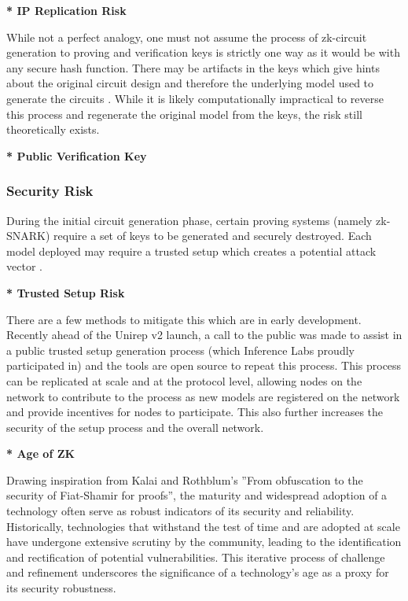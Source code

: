 \documentclass[conference]{IEEEtran}
\begin{document}
\textbf{* IP Replication Risk}

While not a perfect analogy, one must not assume the process of zk-circuit generation to proving and veriﬁcation keys is strictly one way as it would be with any secure hash function. There may be artifacts in the keys which give hints about the original circuit design and therefore the underlying model used to generate the circuits \cite{BenSasson2014SuccinctNZ}. While it is likely computationally impractical to reverse this process and regenerate the original model from the keys, the risk still theoretically exists.

\textbf{* Public Veriﬁcation Key}

\subsubsection{Security Risk}

During the initial circuit generation phase, certain proving systems (namely zk-SNARK) require a set of keys to be generated and securely destroyed. Each model deployed may require a trusted setup which creates a potential attack vector \cite{Bowe2017ScalableMC}.

\textbf{* Trusted Setup Risk}

There are a few methods to mitigate this which are in early development. Recently ahead of the Unirep v2 launch, a call to the public was made to assist in a public trusted setup generation process (which Inference Labs proudly participated in) and the tools are open source to repeat this process. This process can be replicated at scale and at the protocol level, allowing nodes on the network to contribute to the process as new models are registered on the network and provide incentives for nodes to participate. This also further increases the security of the setup process and the overall network.


\textbf{* Age of ZK}

Drawing inspiration from Kalai and Rothblum’s ”From obfuscation to the security of Fiat-Shamir for proofs”, the maturity and widespread adoption of a technology often serve as robust indicators of its security and reliability. Historically, technologies that withstand the test of time and are adopted at scale have undergone extensive scrutiny by the community, leading to the identiﬁcation and rectiﬁcation of potential vulnerabilities. This iterative process of challenge and reﬁnement underscores the signiﬁcance of a technology’s age as a proxy for its security robustness.
\end{document}
